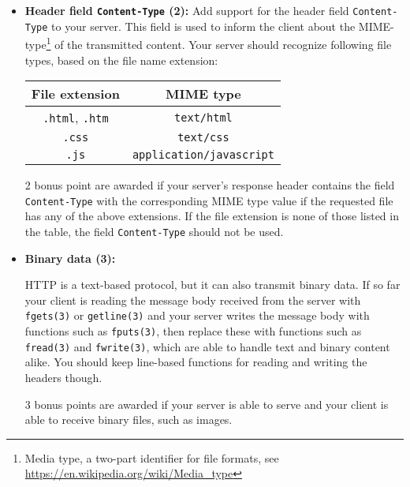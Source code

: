 
\begin{itemize}

\item \textbf{Header field \texttt{Content-Type} (2):}
Add support for the header field \verb|Content-Type| to your server.
This field is used to inform the client about the MIME-type\footnote{
Media type, a two-part identifier for file formats,
see \url{https://en.wikipedia.org/wiki/Media_type}}
of the transmitted content.
Your server should recognize following file types,
based on the file name extension:

\begin{center}
\begin{tabular}{c c}
\textbf{File extension} & \textbf{MIME type} \\
\hline
\verb|.html|, \verb|.htm| & \verb|text/html| \\
\verb|.css| & \verb|text/css| \\
\verb|.js| & \verb|application/javascript| \\
\end{tabular}
\end{center}

2 bonus point are awarded if your server's response header
contains the field \verb|Content-Type| with the corresponding MIME type value
if the requested file has any of the above extensions.
If the file extension is none of those listed in the table,
the field \verb|Content-Type| should not be used.


\item \textbf{Binary data (3):}

HTTP is a text-based protocol, but it can also transmit binary data.
If so far your client is reading the message body received from the server
with \verb|fgets(3)| or \verb|getline(3)|
and your server writes the message body with functions such as \verb|fputs(3)|,
then replace these with functions such as \verb|fread(3)| and \verb|fwrite(3)|,
which are able to handle text and binary content alike.
You should keep line-based functions for reading and writing the headers though.

3 bonus points are awarded if your server is able to serve
and your client is able to receive binary files, such as images.



\end{itemize}
